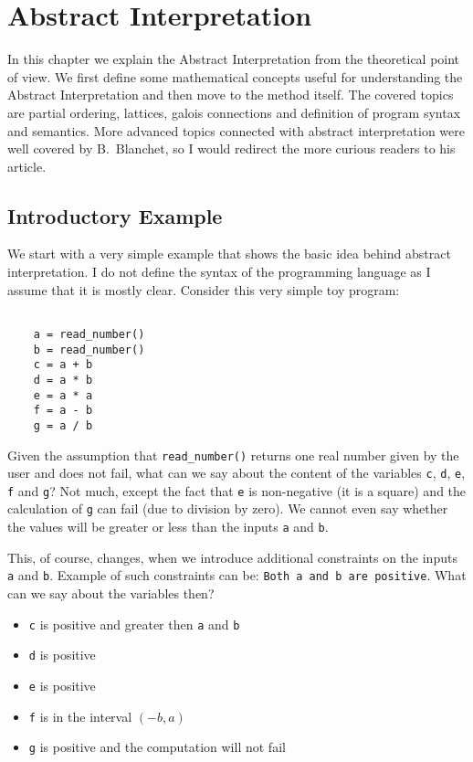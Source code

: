 \chapter{Abstract Interpretation}

In this chapter we explain the Abstract Interpretation from the theoretical point of view.
We first define some mathematical concepts useful for understanding the Abstract Interpretation and then move to the
method itself.
The covered topics are partial ordering, lattices, galois connections and definition of program syntax and semantics.
More advanced topics connected with abstract interpretation were well covered by B.~Blanchet\cite{Blanchet:2002:AI},
so I would redirect the more curious readers to his article.


\section{Introductory Example} %

We start with a very simple example that shows the basic idea behind abstract interpretation.
I do not define the syntax of the programming language as I assume that it is mostly clear.
Consider this very simple toy program:

\begin{verbatim}

    a = read_number()
    b = read_number()
    c = a + b
    d = a * b
    e = a * a
    f = a - b
    g = a / b

\end{verbatim}

Given the assumption that \verb|read_number()| returns one real number given by the user and does not fail, what can
we say about the content of the variables \verb|c|, \verb|d|, \verb|e|, \verb|f| and \verb|g|?
Not much, except the fact that \verb|e| is non-negative (it is a square) and the calculation of \verb|g| can fail
(due to division by zero).
We cannot even say whether the values will be greater or less than the inputs \verb|a| and \verb|b|.

This, of course, changes, when we introduce additional constraints on the inputs \verb|a| and \verb|b|.
Example of such constraints can be: \verb|Both a and b are positive|.
What can we say about the variables then?
\begin{itemize}
    \item \verb|c| is positive and greater then \verb|a| and \verb|b|
    \item \verb|d| is positive
    \item \verb|e| is positive
    \item \verb|f| is in the interval $(-b, a)$
    \item \verb|g| is positive and the computation will not fail
\end{itemize}

